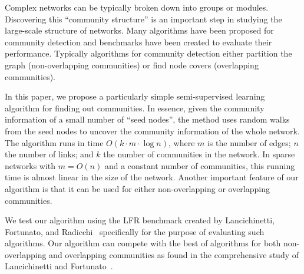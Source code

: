Complex networks can be typically broken down into groups or modules. Discovering 
this ``community structure'' is an important step in studying the large-scale 
structure of networks. Many algorithms have been proposed for community detection 
and benchmarks have been created to evaluate their performance. Typically algorithms 
for community detection either partition the graph (non-overlapping 
communities) or find node covers (overlapping communities). 

In this paper, we propose a particularly simple semi-supervised learning 
algorithm for finding out communities. In essence, given the community information of a small 
number of ``seed nodes'', the method uses random walks from the seed nodes 
to uncover the community information of the whole network. The algorithm runs 
in time $O(k \cdot m \cdot \log n)$, where $m$ is the number of edges; $n$ 
the number of links; and $k$ the number of communities in the network. 
In sparse networks with $m = O(n)$ and a constant number of communities, this 
running time is almost linear in the size of the network. Another important 
feature of our algorithm is that it can be used for either non-overlapping 
or overlapping communities. 

We test our algorithm using the LFR benchmark created by Lancichinetti, 
Fortunato, and Radicchi~\cite{LFR08} 
specifically for the purpose of evaluating such algorithms. Our algorithm 
can compete with the best of algorithms for both non-overlapping 
and overlapping communities as found in the comprehensive study of 
Lancichinetti and Fortunato~\cite{LF09}.
